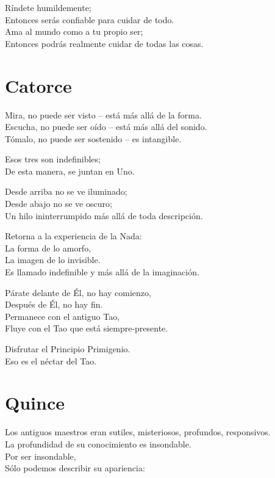 \documentclass[book,b5paper,hidelinks,final]{memoir}
\begin{document}
	Ríndete humildemente;\\
	Entonces serás confiable para cuidar de todo.\\
	Ama al mundo como a tu propio ser;\\
	Entonces podrás realmente cuidar de todas las cosas.
	
	\chapter*{Catorce}
	
	Mira, no puede ser visto -- está más allá de la forma.\\
	Escucha, no puede ser oído -- está más allá del sonido.\\
	Tómalo, no puede ser sostenido -- es intangible.
	
	Esos tres son indefinibles;\\
	De esta manera, se juntan en Uno.
	
	Desde arriba no se ve iluminado;\\
	Desde abajo no se ve oscuro;\\
	Un hilo ininterrumpido más allá de toda descripción.
	
	Retorna a la experiencia de la Nada:\\
	La forma de lo amorfo,\\
	La imagen de lo invisible.\\
	Es llamado indefinible y más allá de la imaginación.
	
	Párate delante de Él, no hay comienzo,\\
	Después de Él, no hay fin.\\
	Permanece con el antiguo Tao,\\
	Fluye con el Tao que está siempre-presente.
	
	Disfrutar el Principio Primigenio.\\
	Eso es el néctar del Tao.
	
	\chapter*{Quince}
	
	Los antiguos maestros eran sutiles, misteriosos, profundos,
	responsivos.\\
	La profundidad de su conocimiento es insondable.\\
	Por ser insondable,\\
	Sólo podemos describir su apariencia:
	
\end{document}
